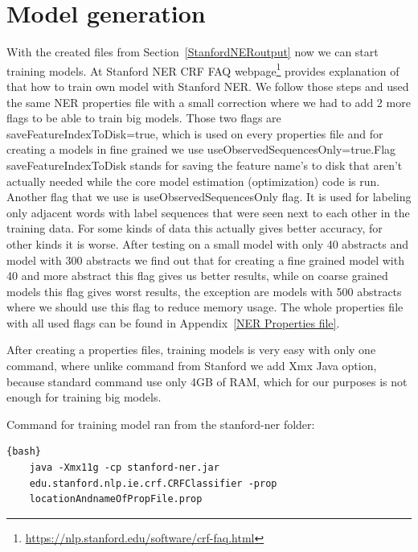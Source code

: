 \documentclass[thesis=M,english]{FITthesis}[2018/05/30]
\begin{document}
\section{Model generation}\label{modelGeneration}
	With the created files from Section~\ref{StanfordNERoutput} now we can start training models. At Stanford NER CRF FAQ webpage\footnote{\url{https://nlp.stanford.edu/software/crf-faq.html}} provides explanation of that how to train own model with Stanford NER. We follow those steps and used the same NER properties file with a small correction where we had to add 2 more flags to be able to train big models. Those two flags are saveFeatureIndexToDisk=true, which is used on every properties file and for creating a models in fine grained we use useObservedSequencesOnly=true.Flag saveFeatureIndexToDisk stands for saving the feature name's to disk that aren't actually needed while the core model estimation (optimization) code is run. Another flag that we use is useObservedSequencesOnly flag. It is used for labeling only adjacent words with label sequences that were seen next to each other in the training data. For some kinds of data this actually gives better accuracy, for other kinds it is worse. After testing on a small model with only 40 abstracts and model with 300 abstracts we find out that for creating a fine grained model with 40 and more abstract this flag gives us better results, while on coarse grained models this flag gives worst results, the exception are models with 500 abstracts where we should use this flag to reduce memory usage. The whole properties file with all used flags can be found in Appendix~\ref{NER Properties file}.  
 
 After creating a properties files, training models is very easy with only one command, where unlike command from Stanford we add Xmx Java option, because standard command use only 4GB of RAM, which for our purposes is not enough for training big models. 
 
 Command for training model ran from the stanford-ner folder:
 \begin{lstlisting}{bash}
 	java -Xmx11g -cp stanford-ner.jar 
 	edu.stanford.nlp.ie.crf.CRFClassifier -prop 
 	locationAndnameOfPropFile.prop
 \end{lstlisting}
	
\end{document}
